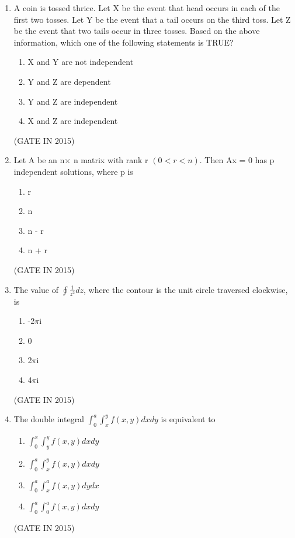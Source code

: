 \documentclass[journal]{IEEEtran}
\begin{document}
\begin{enumerate}
\item A coin is tossed thrice. Let X be the event that head occurs in each of the first two tosses. Let Y be the event that a tail occurs on the third toss. Let Z be the event that two tails occur in three tosses. Based on the above information, which one of the following statements is TRUE?

\begin{multicols}{2}
\begin{enumerate}
\item X and Y are not independent
\item Y and Z are dependent
\item Y and Z are independent
\item X and Z are independent
\end{enumerate}
  \end{multicols} \hfill(GATE IN 2015)

\item Let A be an n$\times$ n matrix with rank r $(0 < r < n)$. Then Ax = 0 has p independent solutions, where p is

\begin{multicols}{4}
\begin{enumerate}
\item r
\item n
\item n - r
\item n + r
\end{enumerate}
  \end{multicols} \hfill(GATE IN 2015)

\item The value of $\oint \frac{1}{z^2} dz$, where the contour is the unit circle traversed clockwise, is

\begin{multicols}{4}
\begin{enumerate}
\item -2$\pi$i
\item 0
\item 2$\pi$i
\item 4$\pi$i
\end{enumerate}
  \end{multicols} \hfill(GATE IN 2015)

\item The double integral $\int_0^a \int_x^y f(x,y)  dx  dy$ is equivalent to

\begin{multicols}{2}
\begin{enumerate}
\item $\int_0^x \int_y^y f(x,y)  dx  dy$
\item $\int_0^a \int_x^y f(x,y)  dx  dy$
\item $\int_0^a \int_x^a f(x,y)  dy  dx$
\item $\int_0^a \int_0^a f(x,y)  dx  dy$
\end{enumerate}
  \end{multicols} \hfill(GATE IN 2015)


\end{enumerate}
\end{document}
